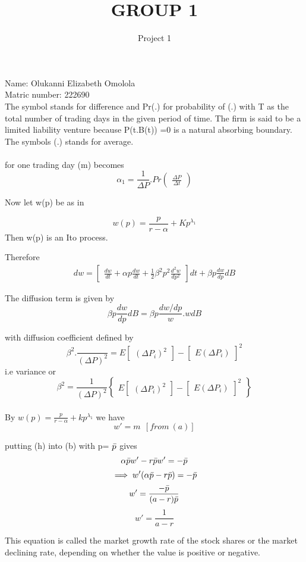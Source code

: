 \documentclass[45pt]{article}
\title{GROUP 1}
\author{Project 1}
\begin{document}
\Huge{Name: Olukanni Elizabeth Omolola}\\

\Huge{Matric number: 222690}\\

\LARGE{}
The symbol stands for difference and Pr(.) for probability of (.) with T as the total number of trading days in the given period of time.  
The firm is said to be a limited liability venture because P(t.B(t)) =0 is a natural absorbing boundary. The symbols (.) stands for average. \\\\
 for one trading day (m) becomes 
$$\alpha_1=\frac{1}{\Delta P}.Pr \begin{pmatrix}
\frac{\Delta P}{\Delta t} 
\end{pmatrix} $$

Now let w(p) be as in 

$$w(p)=\frac{p}{r-\alpha} + Kp^{\lambda_1}$$
Then  w(p) is an Ito process.

Therefore 
    $$\begin{matrix} 
    dw=\begin{bmatrix}
    \frac{dw}{dt}+\alpha p\frac{dw}{dt}+\frac{1}{2} \beta^2p^2\frac{d^2w}{dp^2}
    \end{bmatrix} dt + 
    \beta p \frac{dw}{dp} dB
    \end{matrix}$$

The diffusion term is given by\\
$$\beta p \frac{dw}{dp}dB=\beta p \frac{dw/dp}{w}.wdB$$

with diffusion coefficient defined by \\
$$\beta^2. \frac{ }{(\Delta P)^2}=E\begin{bmatrix}
    (\Delta P_i)^2
\end{bmatrix} - \begin{bmatrix}
    E(\Delta P_i)
\end{bmatrix}^2$$
i.e variance or 
$$\beta^2= \frac{1}{(\Delta P)^2} \begin{Bmatrix}E\begin{bmatrix}
    (\Delta P_i)^2
\end{bmatrix} - \begin{bmatrix}
    E(\Delta P_i)
\end{bmatrix}^2
\end{Bmatrix}$$\\
By $w(p)= \frac{p}{r-\alpha}+kp^{\lambda_1}$ we have\\
$$w'=m~~[from ~(a)]$$
\vspace{1cm}

putting (h) into (b) with p= $\Bar{p}$ gives 
$$\alpha \Bar{p}w' - r\Bar{p}w' =-\Bar{p}$$
$$\implies w'(\alpha \Bar{p} - r\Bar{p}) =-\Bar{p}$$
$$w'=\frac{-\Bar{p}}{(a-r)\Bar{p}}$$
$$w'=\frac{1}{a-r}$$

This equation is called the market growth rate of the stock shares or the market declining rate, depending on whether the value is positive or negative. 
\end{document}
